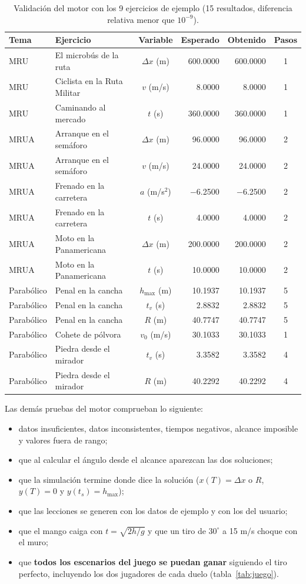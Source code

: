 \documentclass[11pt,letterpaper]{article}
\begin{document}
\begin{table}[H]
\centering
\small
\begin{tabular}{@{}llcrrc@{}}
\toprule
\textbf{Tema} & \textbf{Ejercicio} & \textbf{Variable} & \textbf{Esperado} & \textbf{Obtenido} & \textbf{Pasos} \\
\midrule
MRU & El microbús de la ruta & $\Delta x$ (m) & 600.0000 & 600.0000 & 1 \\
MRU & Ciclista en la Ruta Militar & $v$ (m/s) & 8.0000 & 8.0000 & 1 \\
MRU & Caminando al mercado & $t$ (s) & 360.0000 & 360.0000 & 1 \\
MRUA & Arranque en el semáforo & $\Delta x$ (m) & 96.0000 & 96.0000 & 2 \\
MRUA & Arranque en el semáforo & $v$ (m/s) & 24.0000 & 24.0000 & 2 \\
MRUA & Frenado en la carretera & $a$ (m/s$^2$) & $-$6.2500 & $-$6.2500 & 2 \\
MRUA & Frenado en la carretera & $t$ (s) & 4.0000 & 4.0000 & 2 \\
MRUA & Moto en la Panamericana & $\Delta x$ (m) & 200.0000 & 200.0000 & 2 \\
MRUA & Moto en la Panamericana & $t$ (s) & 10.0000 & 10.0000 & 2 \\
Parabólico & Penal en la cancha & $h_{\max}$ (m) & 10.1937 & 10.1937 & 5 \\
Parabólico & Penal en la cancha & $t_v$ (s) & 2.8832 & 2.8832 & 5 \\
Parabólico & Penal en la cancha & $R$ (m) & 40.7747 & 40.7747 & 5 \\
Parabólico & Cohete de pólvora & $v_0$ (m/s) & 30.1033 & 30.1033 & 1 \\
Parabólico & Piedra desde el mirador & $t_v$ (s) & 3.3582 & 3.3582 & 4 \\
Parabólico & Piedra desde el mirador & $R$ (m) & 40.2292 & 40.2292 & 4 \\
\bottomrule
\end{tabular}
\caption{Validación del motor con los 9 ejercicios de ejemplo (15 resultados, diferencia relativa menor que $10^{-9}$).}
\end{table}

Las demás pruebas del motor comprueban lo siguiente:
\begin{itemize}
  \item datos insuficientes, datos inconsistentes, tiempos negativos, alcance imposible y valores fuera de rango;
  \item que al calcular el ángulo desde el alcance aparezcan las dos soluciones;
  \item que la simulación termine donde dice la solución ($x(T) = \Delta x$ o $R$, $y(T) = 0$ y $y(t_s) = h_{\max}$);
  \item que las lecciones se generen con los datos de ejemplo y con los del usuario;
  \item que el mango caiga con $t = \sqrt{2h/g}$ y que un tiro de $30^\circ$ a 15 m/s choque con el muro;
  \item que \textbf{todos los escenarios del juego se puedan ganar} siguiendo el tiro perfecto, incluyendo los dos jugadores de cada duelo (tabla~\ref{tab:juego}).
\end{itemize}
\end{document}
